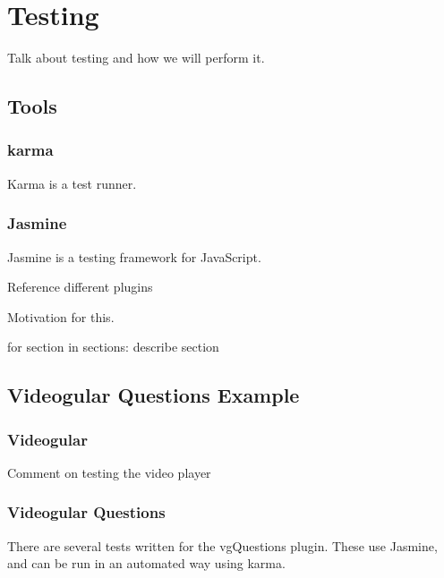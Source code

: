 
\chapter{Testing} \label{Chapter: Testing}

Talk about testing and how we will perform it.

\section{Tools}

\subsection{karma}

Karma is a test runner.

\subsection{Jasmine}

Jasmine is a testing framework for JavaScript.


Reference different plugins

Motivation for this.

{for section in sections: describe section}

\section{Videogular Questions Example} 
\label{Section:Videogular Questions Example}

\subsection{Videogular}

Comment on testing the video player


\subsection{Videogular Questions}
\label{Subsection:Videogular Questions in example}

There are several tests written for the vgQuestions plugin. These use Jasmine, and can be run in an automated way using karma.

